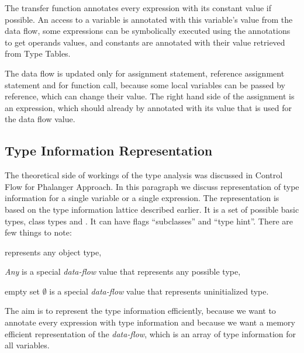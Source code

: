         The transfer function annotates every expression 
        with its constant value if possible. An access to a 
        variable is annotated with this variable's value 
        from the data flow, some expressions can be symbolically 
        executed using the annotations to get operands values, 
        and constants are annotated with their value retrieved 
        from Type Tables.
        
        The data flow is updated only for assignment statement, 
        reference assignment statement and for function call, 
        because some local variables can be passed by reference, 
        which can change their value. The right hand side of 
        the assignment is an expression, which should already by 
        annotated with its value that is used for the data 
        flow value.

    \subsection{Type Information Representation}        
        The theoretical side of workings of the type analysis was 
        discussed in \wsection{} Control Flow for Phalanger Approach.         
        In this paragraph we discuss representation of 
        type information for a single variable or a single expression. 
        The representation is based on the type information 
        lattice described earlier. It is a set of possible 
        basic types, class types and . It can 
        have flags ``subclasses'' and ``type hint''. 
        There are few things to note:
        \begin{itemize*}
            \item {} represents any object type, 
            \item \emph{Any} is a special \emph{data-flow} value that 
                represents any possible type, 
            \item empty set $\emptyset$  is a special \emph{data-flow} value that 
                represents uninitialized type.
        \end{itemize*}
        
        The aim is to represent the type information efficiently, 
        because we want to annotate every expression with type 
        information and because we want a memory efficient 
        representation of the \emph{data-flow}, which is an 
        array of type information for all variables.
        
